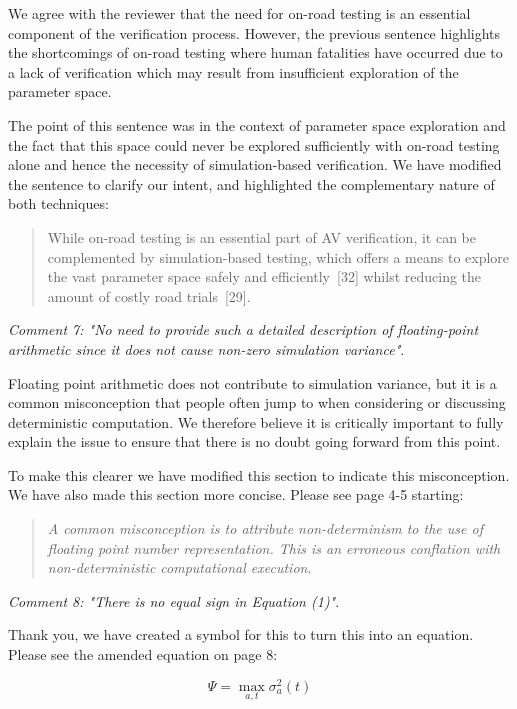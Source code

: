 \documentclass[11pt, a4paper]{letter} %
\begin{document}
\begin{letter}
We agree with the reviewer that the need for on-road testing is an essential component of the verification process. However, the previous sentence highlights the shortcomings of on-road testing where human fatalities have occurred due to a lack of verification which may result from insufficient exploration of the parameter space.

The point of this sentence  was in the context of parameter space exploration and the fact that this space could never be explored sufficiently with on-road testing alone and hence the necessity of simulation-based verification. We have modified the sentence to clarify our intent, and highlighted the complementary nature of both techniques:
\begin{quote}
While on-road testing is an essential part of AV verification, it can be complemented by simulation-based testing, which offers a means to explore the vast parameter space safely and efficiently~[32] whilst reducing the amount of costly road trials~[29].
\end{quote}

\bigskip

\textit{Comment 7: "No need to provide such a detailed description of floating-point arithmetic since it does not cause non-zero simulation variance"}.

Floating point arithmetic does not contribute to simulation variance, but it is a common misconception that people often jump to when considering or discussing deterministic computation. We therefore believe it is critically important to fully explain the issue to ensure that there is no doubt going forward from this point.

To make this clearer we have modified this section to indicate this misconception. We have also made this section more concise. Please see page 4-5 starting:
\begin{quote}
\textit{A common misconception is to attribute non-determinism to the use of floating point number representation. This is an erroneous conflation with non-deterministic computational execution}.
\end{quote}

\bigskip

\textit{Comment 8: "There is no equal sign in Equation (1)"}.

Thank you, we have created a symbol for this to turn this into an equation. Please see the amended equation on page 8:

\begin{equation} \label{eq:max_sigma}
\Psi = \max_{a,t}\sigma_a^{2}(t)
\end{equation}



\end{letter}
\end{document}
